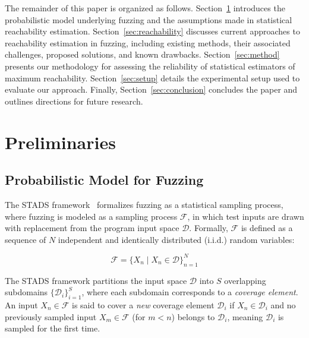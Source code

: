 \documentclass[conference]{IEEEtran}
\begin{document}
The remainder of this paper is organized as follows. Section~\ref{sec:model} introduces the probabilistic model underlying fuzzing and the assumptions made in statistical reachability estimation. Section~\ref{sec:reachability} discusses current approaches to reachability estimation in fuzzing, including existing methods, their associated challenges, proposed solutions, and known drawbacks. Section~\ref{sec:method} presents our methodology for assessing the reliability of statistical estimators of maximum reachability. Section~\ref{sec:setup} details the experimental setup used to evaluate our approach. Finally, Section~\ref{sec:conclusion} concludes the paper and outlines directions for future research.

\section{Preliminaries} \label{sec:model}

\subsection{Probabilistic Model for Fuzzing}

The STADS framework~\cite{stads,residual2021,bedivfuzz,entropic} formalizes
fuzzing as a statistical sampling process,
where fuzzing is modeled as a sampling process $\mathcal{F}$,
in which test inputs are drawn with replacement from the
program input space $\pmb{\mathcal{D}}$.
Formally, $\mathcal{F}$ is defined as a sequence of $N$ independent and identically distributed (i.i.d.) random variables:

\begin{equation*}
    \mathcal{F}=\{X_n \mid X_n \in \pmb{\mathcal{D}}\}_{n=1}^N
\end{equation*}

The STADS framework partitions the input space $\pmb{\mathcal{D}}$ into $S$ overlapping subdomains
$\{\mathcal{D}_i\}_{i=1}^S$, where each subdomain corresponds to a \emph{coverage element}. An input $X_n \in \mathcal{F}$ is said to cover a \emph{new} coverage element $\mathcal{D}_i$ if $X_n \in \mathcal{D}_i$ and no previously sampled input $X_m \in \mathcal{F}$ (for $m < n$) belongs to $\mathcal{D}_i$, meaning $\mathcal{D}_i$ is sampled for the first time.
\end{document}
